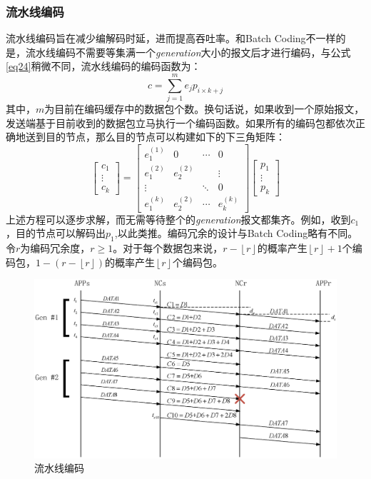 \subsubsection[Pipeline Coding]{\textbf{流水线编码}}\label{pipelinesec}
流水线编码旨在减少编解码时延，进而提高吞吐率。和Batch Coding不一样的是，流水线编码不需要等集满一个\emph{generation}大小的报文后才进行编码，与公式\ref{eq24}稍微不同，流水线编码的编码函数为：
\begin{equation}
c = \sum\limits_{j = 1}^m {{e_j}{p_{i \times k + j}}}
\end{equation}
其中，$m$为目前在编码缓存中的数据包个数。换句话说，如果收到一个原始报文，发送端基于目前收到的数据包立马执行一个编码函数。如果所有的编码包都依次正确地送到目的节点，那么目的节点可以构建如下的下三角矩阵：
\begin{equation}\label{eq28}
\left[ {\begin{array}{*{20}{c}}
	{{c_1}}\\
	\vdots \\
	{{c_k}}
	\end{array}} \right] = \left[ {\begin{array}{*{20}{c}}
	{e_1^{\left( 1 \right)}}&0& \cdots &0\\
	{e_1^{\left( 2 \right)}}&{e_2^{\left( 2 \right)}}&{}& \vdots \\
	\vdots &{}& \ddots &0\\
	{e_1^{\left( k \right)}}&{e_2^{\left( 2 \right)}}& \cdots &{e_k^{\left( k \right)}}
	\end{array}} \right]\left[ {\begin{array}{*{20}{c}}
	{{p_1}}\\
	\vdots \\
	{{p_k}}
	\end{array}} \right]
\end{equation}
上述方程可以逐步求解，而无需等待整个的\emph{generation}报文都集齐。例如，收到$c_{1}$，目的节点可以解码出$p_{1}$,以此类推。编码冗余的设计与Batch Coding略有不同。令$r$为编码冗余度，$r \ge 1$。对于每个数据包来说，$r - \left\lfloor r \right\rfloor $的概率产生$\left\lfloor r \right\rfloor + 1$个编码包，$1 - \left({r - \left\lfloor r \right\rfloor} \right)$的概率产生$\left\lfloor r \right\rfloor$个编码包。
\begin{figure}[htbp]
	\centering
	\includegraphics[width=6in]{figures/pipeline.eps}
	\caption{流水线编码}
	\label{LIUSHUIXIAN_EPS}
\end{figure}
